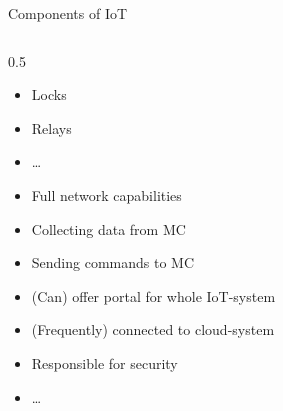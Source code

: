 \begin{frame}{Components of IoT}
\begin{columns}[onlytextwidth]
\begin{column}[T]{0.5\textwidth}
\begin{description}[Actuators]
\begin{itemize}
          \item Locks
          \item Relays
          \item \ldots
        \end{itemize}
        \item[Gateway]
        \begin{itemize}
          \item Full network capabilities
          \item Collecting data from MC
          \item Sending commands to MC
          \item (Can) offer portal for whole IoT-system
          \item (Frequently) connected to cloud-system
          \item Responsible for security
          \item \ldots
        \end{itemize}
      \end{description}
    \end{column}
  \end{columns}
\end{frame}
